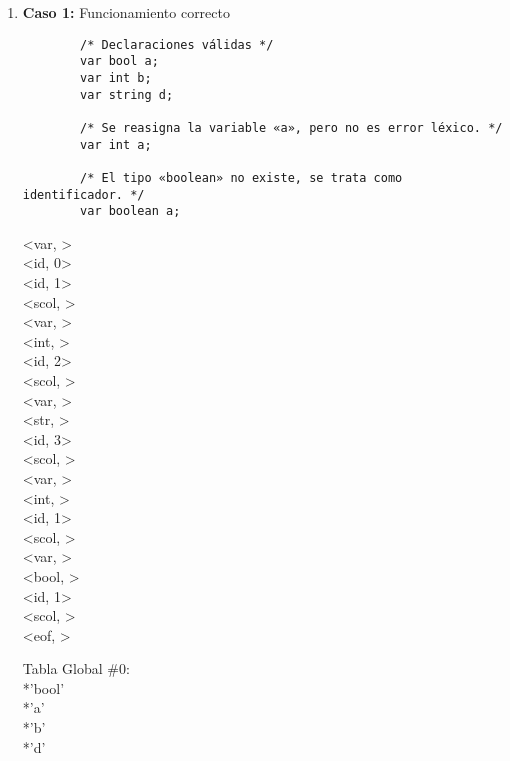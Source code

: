\documentclass{article}
\begin{document}

\begin{enumerate}
    \item \textbf{Caso 1:} Funcionamiento correcto
    
    \begin{tcolorbox}[title={Código fuente}, colback=white]
        \begin{lstlisting}
        /* Declaraciones válidas */
        var bool a;
        var int b;
        var string d;
        
        /* Se reasigna la variable «a», pero no es error léxico. */
        var int a;
        
        /* El tipo «boolean» no existe, se trata como identificador. */
        var boolean a;
        \end{lstlisting}
    \end{tcolorbox}

    \begin{tcolorbox}[title={Volcado del fichero de tokens}, colback=white]
        <var, >\\
        <id, 0>\\
        <id, 1>\\
        <scol, >\\
        <var, >\\
        <int, >\\
        <id, 2>\\
        <scol, >\\
        <var, >\\
        <str, >\\
        <id, 3>\\
        <scol, >\\
        <var, >\\
        <int, >\\
        <id, 1>\\
        <scol, >\\
        <var, >\\
        <bool, >\\
        <id, 1>\\
        <scol, >\\
        <eof, >
    \end{tcolorbox}

    \begin{tcolorbox}[title={Volcado del fichero de la tabla de símbolos}, colback=white]
        Tabla Global \#0: \\
        *'bool' \\
        *'a' \\
        *'b' \\
        *'d'
    \end{tcolorbox}


\end{enumerate}
\end{document}
